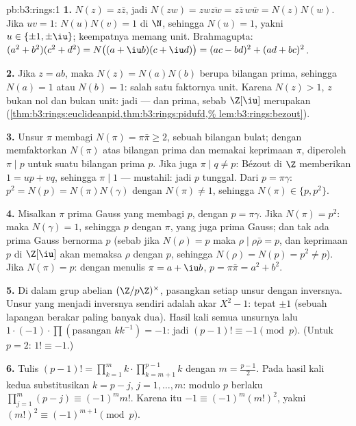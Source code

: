 \begin{solution}{pb:b3:rings:1}
\textbf{1.} $N(z) = z\bar z$, jadi $N(zw) = zw\overline{zw} = z\bar
z\, w \bar w = N(z)N(w)$. Jika $uv = 1$: $N(u)N(v) = 1$ di $\N$, sehingga
$N(u) = 1$, yakni $u \in \{\pm 1, \pm \iu\}$; keempatnya memang unit.
Brahmagupta: $(a^2+b^2)(c^2+d^2) = N\bigl((a + \iu b)(c + \iu
d)\bigr) = (ac - bd)^2 + (ad + bc)^2$.

\textbf{2.} Jika $z = ab$, maka $N(z) = N(a)N(b)$ berupa bilangan prima, sehingga
$N(a) = 1$ atau $N(b) = 1$: salah satu faktornya unit. Karena $N(z) > 1$,
$z$ bukan nol dan bukan unit: jadi  --- dan prima, sebab
$\Z[\iu]$ merupakan 
(\cref{thm:b3:rings:euclideanpid,thm:b3:rings:pidufd,%
lem:b3:rings:bezout}).

\textbf{3.} Unsur $\pi$ membagi $N(\pi) = \pi\bar\pi \geq 2$, sebuah
bilangan bulat; dengan memfaktorkan $N(\pi)$ atas bilangan prima dan memakai keprimaan
$\pi$, diperoleh $\pi \mid p$ untuk suatu bilangan prima $p$. Jika juga
$\pi \mid q \neq p$: Bézout di $\Z$ memberikan $1 = up + vq$, sehingga
$\pi \mid 1$ --- mustahil: jadi $p$ tunggal. Dari $p = \pi\gamma$:
$p^2 = N(p) = N(\pi)N(\gamma)$ dengan $N(\pi) \neq 1$, sehingga $N(\pi)
\in \{p, p^2\}$.

\textbf{4.} Misalkan $\pi$ prima Gauss yang membagi $p$, dengan $p =
\pi\gamma$. Jika $N(\pi) = p^2$: maka $N(\gamma) = 1$, sehingga $p$ 
dengan $\pi$, yang juga prima Gauss; dan tak ada prima
Gauss bernorma $p$ (sebab jika $N(\rho) = p$ maka $\rho \mid
\rho\bar\rho = p$, dan keprimaan $p$ di $\Z[\iu]$ akan memaksa
$\rho$  dengan $p$, sehingga $N(\rho) = N(p) = p^2 \neq
p$).
Jika $N(\pi) = p$: dengan menulis $\pi = a + \iu b$, $p = \pi\bar\pi = a^2
+ b^2$.

\textbf{5.} Di dalam grup abelian $(\Z/p\Z)^\times$, pasangkan setiap
unsur dengan inversnya. Unsur yang menjadi inversnya sendiri adalah akar
$X^2 - 1$: tepat $\pm 1$ (sebuah lapangan berakar paling banyak dua).
Hasil kali semua unsurnya lalu $1 \cdot (-1) \cdot \prod
(\text{pasangan } k k^{-1}) = -1$: jadi $(p-1)! \equiv -1 \pmod p$. (Untuk
$p = 2$: $1! \equiv -1$.)

\textbf{6.} Tulis $(p-1)! = \prod_{k=1}^m k \cdot
\prod_{k=m+1}^{p-1}k$ dengan $m = \frac{p-1}2$. Pada hasil kali kedua
substitusikan $k = p - j$, $j = 1, \dots, m$: modulo $p$ berlaku
$\prod_{j=1}^m (p - j) \equiv (-1)^m m!$. Karena itu $-1 \equiv
(-1)^m (m!)^2$, yakni $(m!)^2 \equiv (-1)^{m+1} \pmod p$.


\end{solution}
